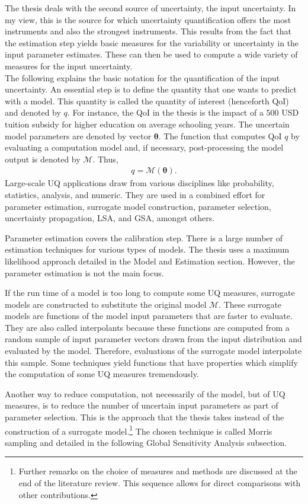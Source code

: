 The thesis deals with the second source of uncertainty, the input uncertainty. In my view, this is the source for which uncertainty quantification offers the most instruments and also the strongest instruments. This results from the fact that the estimation step yields basic measures for the variability or uncertainty in the input parameter estimates. These can then be used to compute a wide variety of measures for the input uncertainty.\\
\newline
The following explains the basic notation for the quantification of the input uncertainty. An essential step is to define the quantity that one wants to predict with a model. This quantity is called the quantity of interest (henceforth QoI) and denoted by $q$. For instance, the QoI in the thesis is the impact of a 500 USD tuition subsidy for higher education on average schooling years. The uncertain model parameters are denoted by vector $\pmb{\theta}$. The function that computes QoI $q$ by evaluating a computation model and, if necessary, post-processing the model output is denoted by $\mathcal{M}$. Thus,
\begin{align}
q = \mathcal{M}(\pmb{\theta}).
\end{align}
Large-scale UQ applications draw from various disciplines like probability, statistics, analysis, and numeric. They are used in a combined effort for parameter estimation, surrogate model construction, parameter selection, uncertainty propagation, LSA, and GSA, amongst others. 

Parameter estimation covers the calibration step. There is a large number of estimation techniques for various types of models. The thesis uses a maximum likelihood approach detailed in the Model and Estimation section. However, the parameter estimation is not the main focus. 


If the run time of a model is too long to compute some UQ measures, surrogate models are constructed to substitute the original model $\mathcal{M}$. These surrogate models are functions of the model input parameters that are faster to evaluate. They are also called interpolants because these functions are computed from a random sample of input parameter vectors drawn from the input distribution and evaluated by the model. Therefore, evaluations of the surrogate model interpolate this sample. Some techniques yield functions that have properties which simplify the computation of some UQ measures tremendously.

Another way to reduce computation, not necessarily of the model, but of UQ measures, is to reduce the number of uncertain input parameters as part of parameter selection. This is the approach that the thesis takes instead of the construction of a surrogate model.\footnote{Further remarks on the choice of measures and methods are discussed at the end of the literature review. This sequence allows for direct comparisons with other contributions.} The chosen technique is called Morris sampling and detailed in the following Global Sensitivity Analysis subsection.

